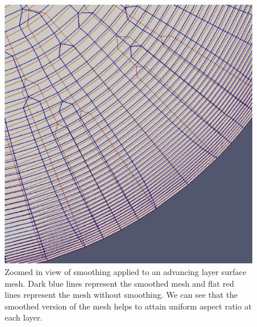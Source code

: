 \begin{figure}
\centering
\includegraphics[width=0.4\linewidth]{img/m2/smoothing/smoothing-comparison-cylinder-cap.eps}
\caption{Zoomed in view of smoothing applied to an advancing layer surface mesh. Dark blue lines represent the smoothed mesh and flat red lines represent the mesh without smoothing. We can see that the smoothed version of the mesh helps to attain uniform aspect ratio at each layer.}
\label{fig-smoothing-cylinder}
\end{figure}































